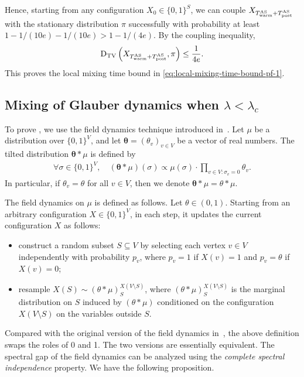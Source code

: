 \documentclass[11pt]{amsart}
\def\-#1{\mathrm{#1}}
\newcommand{\DTV}[2]{\-D_{\mathrm{TV}}\left({#1},{#2}\right)}
\theoremstyle{definition}
\theoremstyle{remark}
\begin{document}
Hence, starting from any configuration $X_0 \in \{0,1\}^{S}$, we can couple $X_{T_{\textnormal{warm}}^{\textnormal{AS}} + T_{\textnormal{post}}^{\textnormal{AS}}}$ with the stationary distribution $\pi$ successfully with probability at least $1 - 1/(10e) - 1/(10e) > 1 - 1/(4e)$. By the coupling inequality,
\begin{align*}
\DTV{X_{T_{\textnormal{warm}}^{\textnormal{AS}} + T_{\textnormal{post}}^{\textnormal{AS}}}}{\pi} \leq \frac{1}{4e}.
\end{align*}
This proves the local mixing time bound in \eqref{eq:local-mixing-time-bound-pf-1}.

\subsection{Mixing of Glauber dynamics when \texorpdfstring{$\lambda < \lambda_c$}{lambda < lambdac}}\label{sec:glauber-mixing-1}
To prove , we use the field dynamics technique introduced in~\cite{CFYZ21}. Let $\mu$ be a distribution over $\{0,1\}^V$, and let $\boldsymbol{\theta} = (\theta_v)_{v \in V}$ be a vector of real numbers. The tilted distribution $\boldsymbol{\theta} * \mu$ is defined by
\begin{align*}
\forall \sigma \in \{0,1\}^V, \quad (\boldsymbol{\theta} * \mu)(\sigma) \propto \mu(\sigma) \cdot \prod_{v \in V: \sigma_v = 0} \theta_v.
\end{align*}
In particular, if $\theta_v = \theta$ for all $v \in V$, then we denote $\boldsymbol{\theta} * \mu = \theta * \mu$.

The field dynamics on $\mu$ is defined as follows. Let $\theta \in (0,1)$. Starting from an arbitrary configuration $X \in \{0,1\}^V$, in each step, it updates the current configuration $X$ as follows:
\begin{itemize}
    \item construct a random subset $S \subseteq V$ by selecting each vertex $v \in V$ independently with probability $p_v$, where $p_v = 1$ if $X(v) = 1$ and $p_v = \theta$ if $X(v) = 0$;
    \item resample $X(S) \sim (\theta * \mu)_S^{X(V \setminus S)}$, where $(\theta * \mu)_S^{X(V \setminus S)}$ is the marginal distribution on $S$ induced by $(\theta * \mu)$ conditioned on the configuration $X(V \setminus S)$ on the variables outside $S$.
\end{itemize}
Compared with the original version of the field dynamics in~\cite{CFYZ21}, the above definition swaps the roles of 0 and 1. The two versions are essentially equivalent.
The spectral gap of the field dynamics can be analyzed using the \emph{complete spectral independence} property. We have the following proposition.
\end{document}
